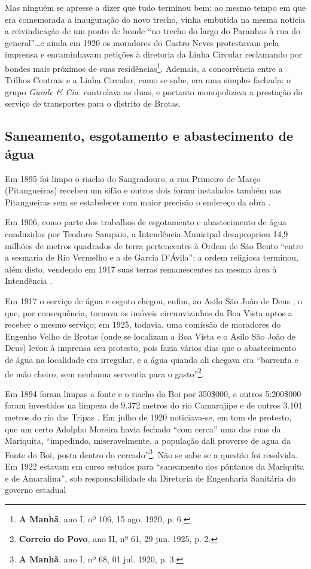 Mas ninguém se apresse a dizer que tudo terminou bem: ao mesmo tempo em que era comemorada a inauguração do novo trecho, vinha embutida na mesma notícia a reivindicação de um ponto de bonde ``no trecho do largo do Paranhos à rua do general''\dots e ainda em 1920 os moradores do Castro Neves protestavam pela imprensa e encaminhavam petições à diretoria da Linha Circular reclamando por bondes mais próximos de suas residências\footnote{\textbf{A Manhã}, ano I, nº 106, 15 ago. 1920, p. 6.}. Ademais, a concorrência entre a Trilhos Centrais e a Linha Circular, como se sabe, era uma simples fachada: o grupo \textit{Guinle \& Cia.} controlava as duas, e portanto monopolizava a prestação do serviço de transportes para o distrito de Brotas.

\subsection{Saneamento, esgotamento e abastecimento de água}



Em 1895 foi limpo o riacho do Sangradouro, a rua Primeiro de Março (Pitangueiras) recebeu um sifão e outros dois foram instalados também nas Pitangueiras sem se estabelecer com maior precisão o endereço da obra \cite[pp.~20, 137-138]{salvador_relatorio_1896}. 


Em 1906, como parte dos trabalhos de esgotamento e abastecimento de água conduzidos por Teodoro Sampaio, a Intendência Municipal desapropriou 14,9 milhões de metros quadrados de terra pertencentes à Ordem de São Bento ``entre a sesmaria de Rio Vermelho e a de Garcia D'Ávila''; a ordem religiosa terminou, além disto, vendendo em 1917 suas terras remanescentes na mesma área à Intendência \cite[p.~306]{VASCONCELOS2002}.

Em 1917 o serviço de água e esgoto chegou, enfim, ao Asilo São João de Deus \cite[p.~63]{bahia_rpe_1914}, o que, por consequência, tornava os imóveis circunvizinhos da Boa Vista aptos a receber o mesmo serviço; em 1925, todavia, uma comissão de moradores do Engenho Velho de Brotas (onde se localizam a Boa Vista e o Asilo São João de Deus) levou à imprensa seu protesto, pois fazia vários dias que o abastecimento de água na localidade era irregular, e a água quando ali chegava era ``barrenta e de máo cheiro, sem nenhuma serventia para o gasto''\footnote{\textbf{Correio do Povo}, ano II, nº 61, 29 jun. 1925, p. 2.}.

Em 1894 foram limpas a fonte e o riacho do Boi por 350\$000, e outros 5:200\$000 foram investidos na limpeza de 9.372 metros do rio Camarajipe e de outros 3.101 metros do rio das Tripas \cite[p.~156]{salvador_relatorio_1894}. Em julho de 1920 noticiava-se, em tom de protesto, que um certo Adolpho Moreira havia fechado ``com cerca'' uma das ruas da Mariquita, ``impedindo, miseravelmente, a população dali proverse de agua da Fonte do Boi, posta dentro do cercado''\footnote{\textbf{A Manhã}, ano I, nº 68, 01 jul. 1920, p. 3.}. Não se sabe se a questão foi resolvida.  Em 1922 estavam em curso estudos para ``saneamento dos pântanos da Mariquita e de Amaralina'', sob responsabilidade da Diretoria de Engenharia Sanitária do governo estadual \cite[p.~409]{bahia_rpe_1922}


